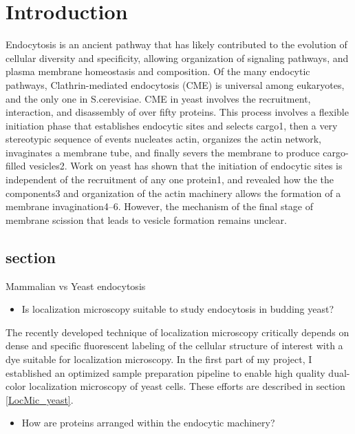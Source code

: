 \chapter{Introduction} %

\label{Ch:Aims} %

Endocytosis is an ancient pathway that has likely contributed to the evolution of cellular diversity and specificity, allowing organization of signaling pathways, and plasma membrane homeostasis and composition. Of the many endocytic pathways, Clathrin-mediated endocytosis (CME) is universal among eukaryotes, and the only one in S.cerevisiae. CME in yeast involves the recruitment, interaction, and disassembly of over fifty proteins. This process involves a flexible initiation phase that establishes endocytic sites and selects cargo1, then a very stereotypic sequence of events nucleates actin, organizes the actin network, invaginates a membrane tube, and finally severs the membrane to produce cargo-filled vesicles2. Work on yeast has shown that the initiation of endocytic sites is independent of the recruitment of any one protein1, and revealed how the the components3 and organization of the actin machinery allows the formation of a membrane invagination4–6. However, the mechanism of the final stage of membrane scission that leads to vesicle formation remains unclear.

	\section{section}
	Mammalian vs Yeast endocytosis
	
\begin{itemize}
	\item Is localization microscopy suitable to study endocytosis in budding yeast?
\end{itemize}

The recently developed technique of localization microscopy critically depends on dense and specific fluorescent labeling of the cellular structure of interest with a dye suitable for localization microscopy. In the first part of my project, I established an optimized sample preparation pipeline to enable high quality dual-color localization microscopy of yeast cells. These efforts are described in section \ref{LocMic_yeast}.

\begin{itemize}
	\item How are proteins arranged within the endocytic machinery?
\end{itemize}

